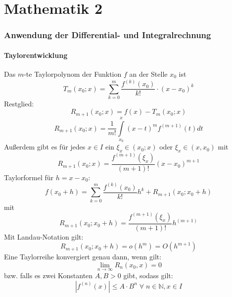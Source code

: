 \documentclass[a4paper,twocolumn,10pt]{article}
\begin{document}
\tableofcontents
\newpage

\part{Mathematik 2}

\section{Anwendung der Differential- und Integralrechnung}

\subsection{Taylorentwicklung}
Das $m$-te Taylorpolynom der Funktion $f$ an der Stelle $x_0$ ist
\begin{equation*}
T_m(x_0;x)=\sum\limits_{k=0}^{m}\frac{f^{(k)}(x_0)}{k!}\cdot (x-x_0)^k
\end{equation*}
Restglied:
\begin{equation*}
R_{m+1}(x_0;x)=f(x)-T_m(x_0;x)
\end{equation*}
\begin{equation*}
R_{m+1}(x_0;x)=\frac{1}{m!}\int\limits_{x_0}^{x}(x-t)^m f^{(m+1)}(t)dt
\end{equation*}
Außerdem gibt es für jedes $x\in I$ ein $\xi_x\in (x_0;x)$ oder $\xi_x\in (x,x_0)$ mit
\begin{equation*}
R_{m+1}(x_0;x)=\frac{f^{(m+1)}(\xi_x)}{(m+1)!}(x-x_0)^{m+1}
\end{equation*}
Taylorformel für $h=x-x_0$:
\begin{equation*}
f(x_0+h)=\sum\limits_{k=0}^{m}\frac{f^{(k)}(x_0)}{k!}h^k+R_{m+1}(x_0;x_0+h)
\end{equation*}
mit
\begin{equation*}
R_{m+1}(x_0;x_0+h)=\frac{f^{(m+1)}(\xi_x)}{(m+1)!}h^{(m+1)}
\end{equation*}
Mit Landau-Notation gilt:
\begin{equation*}
R_{m+1}(x_0;x_0+h)=o(h^m)=O(h^{m+1})
\end{equation*}
Eine Taylorreihe konvergiert genau dann, wenn gilt:
\begin{equation*}
\lim\limits_{n\rightarrow\infty}R_n(x_0,x)=0
\end{equation*}
bzw. falls es zwei Konstanten $A,B>0$ gibt, sodass gilt:
\begin{equation*}
|f^{(n)}(x)|\leq A\cdot B^n\;\forall\;n\in\mathbb{N}, x\in I
\end{equation*}
\end{document}

